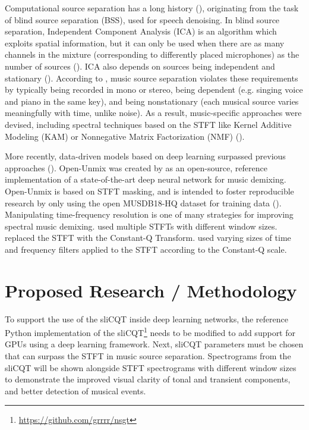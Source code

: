 \documentclass[letter,12pt]{article}
\begin{document}
Computational source separation has a long history (\cite{musicsepintro1}), originating from the task of blind source separation (BSS), used for speech denoising. In blind source separation, Independent Component Analysis (ICA) is an algorithm which exploits spatial information, but it can only be used when there are as many channels in the mixture (corresponding to differently placed microphones) as the number of sources (\cite{ica1}). ICA also depends on sources being independent and stationary (\cite{musicsepintro1}). According to \textcite{musicsepintro1}, music source separation violates these requirements by typically being recorded in mono or stereo, being dependent (e.g. singing voice and piano in the same key), and being nonstationary (each musical source varies meaningfully with time, unlike noise). As a result, music-specific approaches were devised, including spectral techniques based on the STFT like Kernel Additive Modeling (KAM) or Nonnegative Matrix Factorization (NMF) (\cite{musicsepgood}).

More recently, data-driven models based on deep learning surpassed previous approaches (\cite{sisec2018}). Open-Unmix was created by \textcite{umx} as an open-source, reference implementation of a state-of-the-art deep neural network for music demixing. Open-Unmix is based on STFT masking, and is intended to foster reproducible research by only using the open MUSDB18-HQ dataset for training data (\cite{musdb18hq}). Manipulating time-frequency resolution is one of many strategies for improving spectral music demixing. \textcite{driedger} used multiple STFTs with different window sizes. \textcite{fitzgerald2} replaced the STFT with the Constant-Q Transform. \textcite{plumbley2} used varying sizes of time and frequency filters applied to the STFT according to the Constant-Q scale.

\section{Proposed Research / Methodology}

To support the use of the sliCQT inside deep learning networks, the reference Python implementation of the sliCQT\footnote{\url{https://github.com/grrrr/nsgt}} needs to be modified to add support for GPUs using a deep learning framework. Next, sliCQT parameters must be chosen that can surpass the STFT in music source separation. Spectrograms from the sliCQT will be shown alongside STFT spectrograms with different window sizes to demonstrate the improved visual clarity of tonal and transient components, and better detection of musical events.
\end{document}
